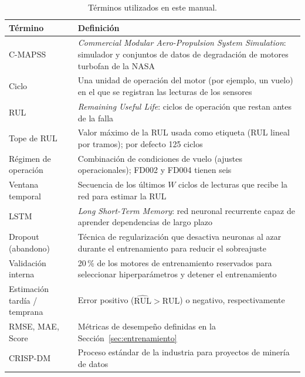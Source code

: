 \documentclass[letterpaper]{article}
\newcommand{\encabezadotabla}{\rowcolor{red!20}}
\newcommand{\filatabla}{\rowcolor{colorOtros}}
\begin{document}
\begin{table}[H]
\centering
\fontsize{9}{11}\selectfont
\caption{Términos utilizados en este manual.}
\label{tab:glosario}
\renewcommand{\arraystretch}{1.45}
\begin{tabularx}{\textwidth}{|>{\raggedright\arraybackslash}p{3.8cm}|X|}
    \hline
    \encabezadotabla \textbf{Término} & \textbf{Definición} \\
    \hline
    \filatabla C-MAPSS & \textit{Commercial Modular Aero-Propulsion System Simulation}: simulador y conjuntos de datos de degradación de motores turbofan de la NASA \\ \hline
    \filatabla Ciclo & Una unidad de operación del motor (por ejemplo, un vuelo) en el que se registran las lecturas de los sensores \\ \hline
    \filatabla RUL & \textit{Remaining Useful Life}: ciclos de operación que restan antes de la falla \\ \hline
    \filatabla Tope de RUL & Valor máximo de la RUL usada como etiqueta (RUL lineal por tramos); por defecto 125 ciclos \\ \hline
    \filatabla Régimen de operación & Combinación de condiciones de vuelo (ajustes operacionales); FD002 y FD004 tienen seis \\ \hline
    \filatabla Ventana temporal & Secuencia de los últimos $W$ ciclos de lecturas que recibe la red para estimar la RUL \\ \hline
    \filatabla LSTM & \textit{Long Short-Term Memory}: red neuronal recurrente capaz de aprender dependencias de largo plazo~\cite{hochreiter1997lstm} \\ \hline
    \filatabla Dropout (abandono) & Técnica de regularización que desactiva neuronas al azar durante el entrenamiento para reducir el sobreajuste~\cite{srivastava2014dropout} \\ \hline
    \filatabla Validación interna & 20\,\% de los motores de entrenamiento reservados para seleccionar hiperparámetros y detener el entrenamiento \\ \hline
    \filatabla Estimación tardía / temprana & Error positivo ($\widehat{\text{RUL}}>\text{RUL}$) o negativo, respectivamente \\ \hline
    \filatabla RMSE, MAE, Score & Métricas de desempeño definidas en la Sección~\ref{sec:entrenamiento} \\ \hline
    \filatabla CRISP-DM & Proceso estándar de la industria para proyectos de minería de datos~\cite{wirth2000crisp} \\ \hline
\end{tabularx}
\end{table}
\end{document}
